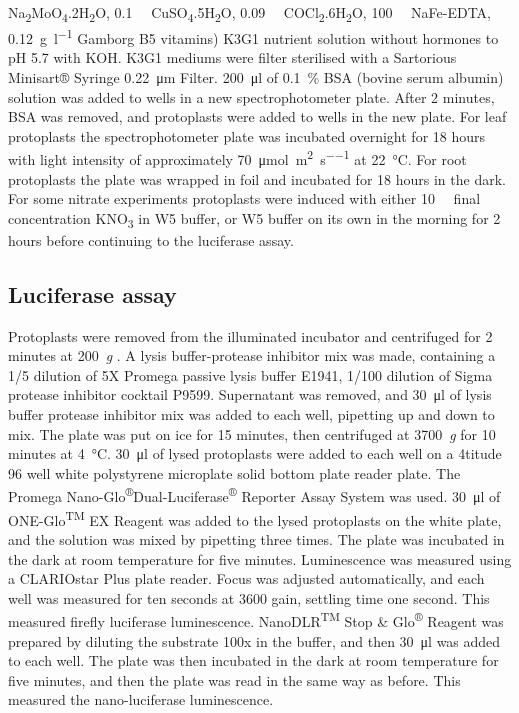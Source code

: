 Na\textsubscript{2}MoO\textsubscript{4}.2H\textsubscript{2}O, \SI{0.1}{\micro\Molar}
CuSO\textsubscript{4}.5H\textsubscript{2}O, \SI{0.09}{\micro\Molar}
COCl\textsubscript{2}.6H\textsubscript{2}O, \SI{100}{\micro\Molar}  NaFe\hyp{}EDTA, \SI{0.12}{\g\per\l} Gamborg B5 vitamins) K3G1 nutrient solution
without hormones to pH 5.7 with KOH. K3G1 mediums were filter sterilised with a Sartorious Minisart® Syringe \SI{0.22}{\um} Filter. \SI{200}{\micro\litre} of \SI{0.1}{\percent} BSA (bovine serum albumin) solution was added to wells in a new spectrophotometer plate. After 2 minutes, BSA was removed, and
protoplasts were added to wells in the new plate. For leaf protoplasts
the spectrophotometer plate was incubated overnight for 18 hours with
light intensity of approximately \SI{70}{\umol\per\square\meter\per\s} at \SI{22}{\degreeCelsius}. For root protoplasts
the plate was wrapped in foil and incubated for 18 hours in the
dark. For some nitrate experiments protoplasts were induced with either
\SI{10}{\milli\Molar} final concentration KNO\textsubscript{3} in W5 buffer, or W5 buffer on its own in the morning for 2 hours before continuing to the
luciferase assay.

\subsection{Luciferase assay}
\label{luciferase-assay}

Protoplasts were removed from the illuminated incubator and centrifuged for 2 minutes at 200~\textit{g} . A lysis buffer\hyp{}protease inhibitor mix was made, containing a 1/5 dilution of 5X Promega passive lysis buffer E1941, 1/100 dilution of Sigma protease inhibitor cocktail P9599. Supernatant was removed, and \SI{30}{\micro\litre} of lysis buffer protease inhibitor
mix was added to each well, pipetting up and down to mix. The plate was
put on ice for 15 minutes, then centrifuged at 3700~\textit{g} for 10
minutes at \SI{4}{\degreeCelsius}. \SI{30}{\micro\litre} of lysed protoplasts were added
to each well on a 4titude 96 well white polystyrene microplate solid
bottom plate reader plate. The Promega
Nano\hyp{}Glo\textsuperscript{®}Dual\hyp{}Luciferase\textsuperscript{®} Reporter
Assay System was used. \SI{30}{\micro\litre} of ONE\hyp{}Glo\textsuperscript{TM} EX Reagent
was added to the lysed protoplasts on the white plate, and the solution was mixed by pipetting three times. The plate was incubated in the dark at room temperature for five minutes. Luminescence was measured using a CLARIOstar Plus plate reader. Focus was adjusted automatically, and each well was measured for ten seconds at 3600 gain, settling time one second. This measured firefly luciferase luminescence. NanoDLR\textsuperscript{TM} Stop \& Glo\textsuperscript{®} Reagent was prepared by diluting the substrate 100x in the buffer, and then \SI{30}{\micro\litre}
was added to each well. The plate was then incubated in the dark at room
temperature for five minutes, and then the plate was read in the same
way as before. This measured the nano\hyp{}luciferase luminescence.

